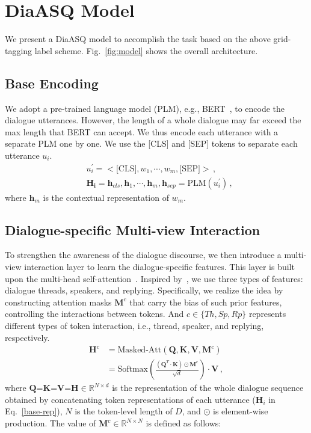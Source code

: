 \documentclass[11pt]{article}
\begin{document}
\section{DiaASQ Model}
We present a DiaASQ model to accomplish the task based on the above grid-tagging label scheme.
Fig.~\ref{fig:model} shows the overall architecture.

\subsection{Base Encoding}
We adopt a pre-trained language model (PLM), e.g., BERT~\cite{DevlinCLT19}, to encode the dialogue utterances.
However, the length of a whole dialogue may far exceed the max length that BERT can accept.
We thus encode each utterance with a separate PLM one by one.
We use the [CLS] and [SEP] tokens to separate each utterance $u_i$.
\setlength\abovedisplayskip{2pt}
\setlength\belowdisplayskip{2pt}
\begin{align}
&u^{'}_i = < \text{[CLS]}, w_{1}, \cdots , w_{m}, \text{[SEP]} > \,, \\
\label{base-rep} &\bm{H_i} = \bm{h}_{cls},  \bm{h}_1, \cdots, \bm{h}_m, \bm{h}_{sep} = \text{PLM}( u^{'}_i ) \,,
\end{align}
where $\bm{h}_m$ is the contextual representation of $w_{m}$.

\vspace{-5pt}
\subsection{Dialogue-specific Multi-view Interaction}

To strengthen the awareness of the dialogue discourse, we then introduce a multi-view interaction layer to learn the dialogue-specific features.
This layer is built upon the multi-head self-attention~\cite{VaswaniSPUJGKP17}.
Inspired by~\cite{ShenCQX21, ZhaoZ0LJW022}, we use three types of features: dialogue threads, speakers, and replying.
Specifically, we realize the idea by constructing attention masks $\bm{M}^c$ that carry the bias of such prior features, controlling the interactions between tokens.
And $c\in\{Th, Sp, Rp\}$ represents different types of token interaction, i.e., thread, speaker, and replying, respectively. 
\begin{equation}
\begin{aligned}
    \bm{H}^c &= \text{Masked-Att}(\bm{Q},\bm{K},\bm{V},\bm{M}^c)  \\
    &= \text{Softmax} (\frac{(\bm{Q}^T \cdot  \bm{K}) \odot \bm{M}^c }{\sqrt{d}} ) \cdot \bm{V} \,,
\end{aligned}
\end{equation}
where $\bm{Q}$=$\bm{K}$=$\bm{V}$=$\bm{H}\in\mathbb{R}^{N\times d}$ is the representation of the whole dialogue sequence obtained by concatenating token representations of each utterance ($\bm{H}_i$ in Eq.~\eqref{base-rep}), $N$ is the token-level length of $D$,
and $\odot$ is element-wise production.
The value of $\bm{M}^c \in \mathbb{R}^{N\times N}$ is defined as follows:
\end{document}
